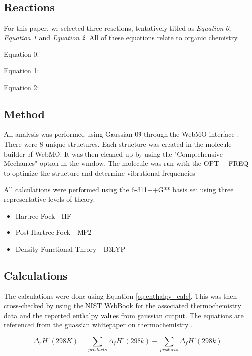 \subsection{Reactions}

For this paper, we selected three reactions, tentatively titled as \emph{Equation 0}, \emph{Equation 1} and \emph{Equation 2}. All of these equations relate to organic chemistry.

Equation 0: 

Equation 1: 

Equation 2: 

\subsection{Method}

All analysis was performed using Gaussian 09 through the WebMO interface \cite{polik_webmo_nodate}. There were 8 unique structures. Each structure was created in the molecule builder of WebMO. It was then cleaned up by using the "Comprehensive - Mechanics" option in the window. The molecule was run with the OPT + FREQ to optimize the structure and determine vibrational frequencies.

All calculations were performed using the 6-311++G** basis set using three representative levels of theory.

\begin{itemize}
    \item Hartree-Fock - HF
    \item Post Hartree-Fock - MP2
    \item Density Functional Theory - B3LYP
\end{itemize}

\subsection{Calculations}

The calculations were done using Equation \ref{eq:enthalpy_calc}. This was then cross-checked by using the NIST WebBook \cite{linstrom_nist_1997} for the associated thermochemistry data and the reported enthalpy values from gaussian output. The equations are referenced from the guassian whitepaper on thermochemistry \cite{ochterski_thermochemistry_2012}.

\begin{equation} \label{eq:enthalpy_calc}
    \Delta_r H^{\circ} (298K) = \sum_{products} \Delta_f H^{\circ} (298k) - \sum_{products} \Delta_f H^{\circ} (298k)
\end{equation}

